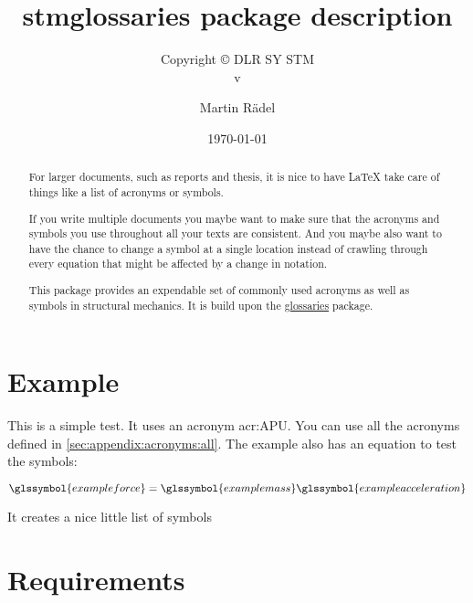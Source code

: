 \documentclass[%
  type=article,%
  layout=koma,%
  hyperref=true,%
  conditionallox=true,%
  conditionalloxnewpage=false,%
  date=true,%
  index=true,%
  listings=true%
]{stmtext}
\author{Martin R\"{a}del}
\title{stmglossaries package description}
\subtitle{Copyright \copyright{} \the\year{} DLR SY STM\\v\formatdate[versiondatestyle]{\DTMToday}}
\date{\today}
\begin{document}
\maketitle

\begin{abstract}
For larger documents, such as reports and thesis, it is nice to have \LaTeX{} take care of things like a list of acronyms or symbols.

If you write multiple documents you maybe want to make sure that the acronyms and symbols you use throughout all your texts are consistent. And you maybe also want to have the chance to change a symbol at a single location instead of crawling through every equation that might be affected by a change in notation.

This package provides an expendable set of commonly used acronyms as well as symbols in structural mechanics. It is build upon the \href{https://ctan.org/pkg/glossaries?lang=en}{glossaries} package.
\end{abstract}

\tableofcontents

\conditionallistoffigures  %
\conditionallistoftables   %
\conditionallistoflistings %

\section{Example}

This is a simple test. It uses an acronym \gls{acr:APU}. You can use all the acronyms defined in \autoref{sec:appendix:acronyms:all}. The example also has an equation to test the symbols:

\begin{equation}  
\glssymbol{exampleforce} = \glssymbol{examplemass}\glssymbol{exampleacceleration}
\end{equation}

It creates a nice little list of symbols

\glstocfalse
\printglossary[type=example1list  ,style=stmsymbolstyle  ,nonumberlist]
\glstoctrue

\section{Requirements}
\label{sec:requirements}
\end{document}
